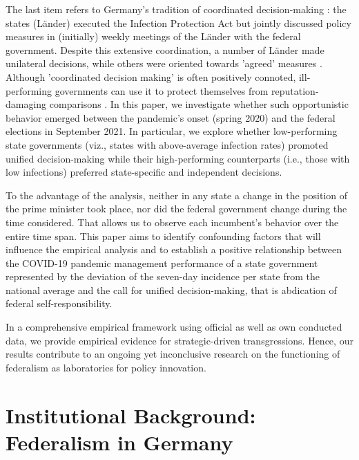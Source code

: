 \documentclass[12pt, abstracton]{scrartcl}
\begin{document}
The last item refers to Germany's tradition of coordinated decision-making \citep{Hegele2017}: the states (Länder) executed the Infection Protection Act but jointly discussed policy measures in (initially) weekly meetings of the Länder with the federal government.  Despite this extensive coordination, a number of Länder made unilateral decisions, while others were oriented towards 'agreed' measures \citep{Hegele2021}. Although 'coordinated decision making' is often positively connoted, ill-performing governments can use it to protect themselves from reputation-damaging comparisons \citep{Keen2013}. In this paper, we investigate whether such opportunistic behavior emerged between the pandemic's onset (spring 2020) and the federal elections in September 2021. In particular, we explore whether low-performing state governments (viz., states with above-average infection rates) promoted unified decision-making while their high-performing counterparts (i.e., those with low infections) preferred state-specific and independent decisions.

To the advantage of the analysis, neither in any state a change in the position of the prime minister took place, nor did the federal government change during the time considered. That allows us to observe each incumbent's behavior over the entire time span. This paper aims to identify confounding factors that will influence the empirical analysis and to establish a positive relationship between the COVID-19 pandemic management performance of a state government represented by the deviation of the seven-day incidence per state from the national average and the call for unified decision-making, that is abdication of federal self-responsibility. 

In a comprehensive empirical framework using official as well as own conducted data, we provide empirical evidence for strategic-driven transgressions. Hence, our results contribute to an ongoing yet inconclusive research on the functioning of federalism as laboratories for policy innovation. 

\section[Federalism in Germany]{Institutional Background: Federalism in Germany}\label{FederalisminGermany}
%
\end{document}
